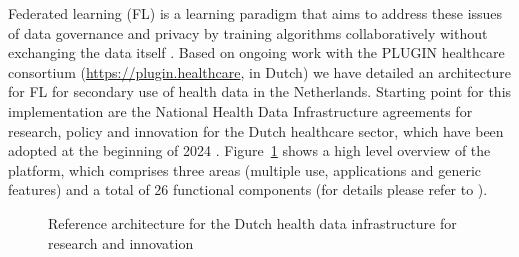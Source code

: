 \documentclass[
  authoryear]{elsarticle}
\begin{document}
Federated learning (FL) is a learning paradigm that aims to address
these issues of data governance and privacy by training algorithms
collaboratively without exchanging the data itself
\citep{rieke2020future, teo2024federated}. Based on ongoing work with
the PLUGIN healthcare consortium (\url{https://plugin.healthcare}, in
Dutch) we have detailed an architecture for FL for secondary use of
health data in the Netherlands. Starting point for this implementation
are the National Health Data Infrastructure agreements for research,
policy and innovation for the Dutch healthcare sector, which have been
adopted at the beginning of 2024 \citep{healthri2024agreements}.
Figure~\ref{fig-healthri-architecture} shows a high level overview of
the platform, which comprises three areas (multiple use, applications
and generic features) and a total of 26 functional components (for
details please refer to \citep{healthri2024agreements}).

\begin{figure}


\caption{\label{fig-healthri-architecture}Reference architecture for the
Dutch health data infrastructure for research and innovation
\citep{healthri2024agreements}}

\end{figure}%
\end{document}
